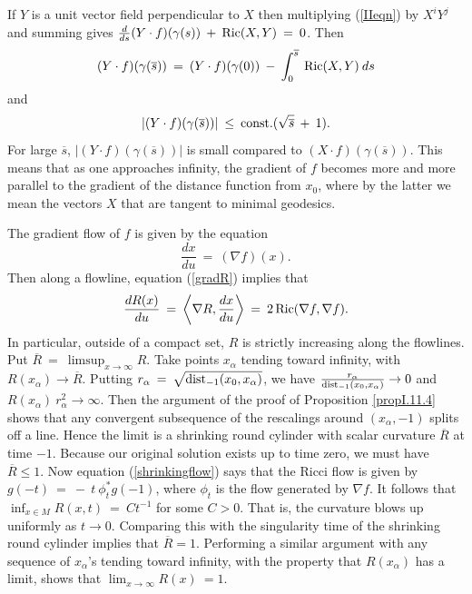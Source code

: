 If $Y$ is a unit vector field perpendicular to $X$ then
multiplying (\ref{IIeqn}) by $X^i Y^j$ and summing gives
$\frac{d}{ds} (Y \cdot f)(\gamma(s)) \: + \: \operatorname{Ric}(X, Y)
\: =\: 0$. Then
\begin{equation}
(Y \cdot f)(\gamma(\overline{s})) \: = \:
(Y \cdot f)(\gamma(0)) \: - \:
\int_0^{\overline{s}} \: \operatorname{Ric}(X, Y) \: ds
\end{equation}
and
\begin{equation}
|(Y \cdot f)(\gamma(\overline{s}))| \: \le \:
\operatorname{const.} (\sqrt{\overline{s}} \: +\: 1).
\end{equation}
For large $\overline{s}$, $|(Y \cdot f)(\gamma(\overline{s}))|$
is small compared to $(X \cdot f)(\gamma(\overline{s}))$. This
means that as one approaches infinity, the gradient of $f$ becomes
more and more parallel to the gradient of the distance function
from $x_0$, where by the latter we mean the vectors $X$ that are
tangent to minimal geodesics.

The gradient flow of $f$ is given by the equation
\begin{equation}
\frac{dx}{du} \: =\: (\nabla f)(x).
\end{equation}
Then along a flowline, equation (\ref{gradR}) implies that
\begin{equation}
\frac{dR(x)}{du} \: = \: \left\langle \nabla R, \frac{dx}{du} \right\rangle
\: = \: 2 \operatorname{Ric}(\nabla f, \nabla f).
\end{equation}
In particular, outside of a compact set, $R$ is strictly increasing
along the flowlines. Put $\overline{R} \: = \: \limsup_{x \rightarrow \infty}
R$.
Take points $x_\alpha$ tending toward infinity, with
$R(x_\alpha) \rightarrow \overline{R}$. Putting
${r}_\alpha \: = \: \sqrt{\operatorname{dist}_{-1}(x_0, x_\alpha)}$, we have
$\frac{{r}_\alpha}{\operatorname{dist}_{-1}(x_0, x_\alpha)} \rightarrow 0$ and
$R(x_\alpha) \: {r}_\alpha^2 \rightarrow \infty$.
Then the argument of the proof of Proposition \ref{propI.11.4}
shows that any convergent
subsequence of the rescalings around $(x_\alpha, -1)$ splits off
a line.  Hence the limit is a shrinking round cylinder with
scalar curvature $\overline{R}$ at time $-1$. Because our original
solution exists up to time zero, we must have
$\overline{R} \le 1$.
Now equation
(\ref{shrinkingflow}) says that the Ricci flow
is given by $g(-t) \: = \: - \: t \: \phi_t^* g(-1)$, where
$\phi_t$ is the flow generated by $\nabla f$.
It follows that $\inf_{x \in M} R(x,t) \: = \: Ct^{-1}$ for some $C > 0$.
That is, the curvature blows up uniformly as $t \rightarrow 0$.
Comparing this with the
singularity time of the shrinking round cylinder implies that
$\overline{R} = 1$. Performing a similar argument with any
sequence of $x_\alpha$'s tending toward infinity, with the property
that $R(x_\alpha)$ has a limit, shows that
$\lim_{x \rightarrow \infty} R(x) \: = 1$.

